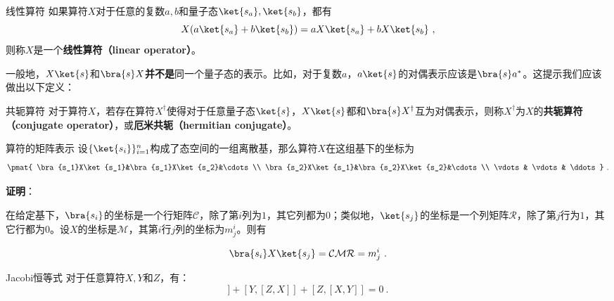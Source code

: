 \begin{definition}{线性算符}\label{def_QMPrcp_11}
如果算符$X$对于任意的复数$a, b$和量子态$\ket{s_a}, \ket{s_b}$，都有
\begin{equation}
X(a\ket{s_a}+b\ket{s_b}) = aX\ket{s_a}+bX\ket{s_b}~,
\end{equation}
则称$X$是一个\textbf{线性算符（linear operator）}。
\end{definition}


一般地，$X\ket{s}$和$\bra{s}X$\textbf{并不是}同一个量子态的表示。比如，对于复数$a$，$a\ket{s}$的对偶表示应该是$\bra{s}a^*$。这提示我们应该做出以下定义：

\begin{definition}{共轭算符}\label{def_QMPrcp_5}
对于算符$X$，若存在算符$X^\dagger$使得对于任意量子态$\ket{s}$，$X\ket{s}$都和$\bra{s}X^\dagger$互为对偶表示，则称$X^\dagger$为$X$的\textbf{共轭算符（conjugate operator）}，或\textbf{厄米共轭（hermitian conjugate）}。
\end{definition}





\begin{theorem}{算符的矩阵表示}\label{the_QMPrcp_1}
设$\{\ket{s_i}\}_{i=1}^n$构成了态空间的一组离散基，那么算符$X$在这组基下的坐标为
\begin{equation}
\pmat{
    \bra{s_1}X\ket{s_1}&\bra{s_1}X\ket{s_2}&\cdots\\
    \bra{s_2}X\ket{s_1}&\bra{s_2}X\ket{s_2}&\cdots\\
    \vdots & \vdots& \ddots
}~.
\end{equation}
\end{theorem}

\textbf{证明}：

在给定基下，$\bra{s_i}$的坐标是一个行矩阵$\mathcal{C}$，除了第$i$列为$1$，其它列都为$0$；类似地，$\ket{s_j}$的坐标是一个列矩阵$\mathcal{R}$，除了第$j$行为$1$，其它行都为$0$。设$X$的坐标是$\mathcal{M}$，其第$i$行$j$列的坐标为$m^i_j$。则有

\begin{equation}
\bra{s_i}X\ket{s_j} = \mathcal{CMR} = m^i_j~.
\end{equation}




\begin{theorem}{Jacobi恒等式}
对于任意算符$X, Y$和$Z$，有：
\begin{equation}
[X, [Y, Z]]+[Y, [Z, X]]+[Z, [X, Y]]=0~.
\end{equation}
\end{theorem}

